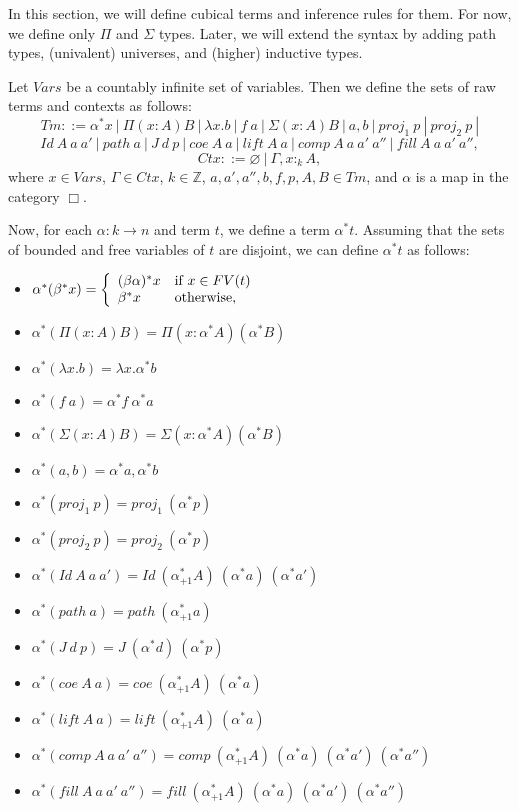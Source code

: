 \documentclass{amsart}
\theoremstyle{definition}
\theoremstyle{remark}
\newcommand{\Z}{\mathbb{Z}}
\numberwithin{table}{section}
\begin{document}
In this section, we will define cubical terms and inference rules for them.
For now, we define only $\Pi$ and $\Sigma$ types.
Later, we will extend the syntax by adding path types, (univalent) universes, and (higher) inductive types.

Let $Vars$ be a countably infinite set of variables.
Then we define the sets of raw terms and contexts as follows:
\[ Tm ::= \alpha^* x\ |\ \Pi (x : A) B\ |\ \lambda x. b\ |\ f\ a\ |\ \Sigma (x : A) B\ |\ a , b\ |\ proj_1\ p\ |\ proj_2\ p\ | \]
\[ Id\ A\ a\ a'\ |\ path\ a\ |\ J\ d\ p\ |\ coe\ A\ a\ |\ lift\ A\ a\ |\ comp\ A\ a\ a'\ a''\ |\ fill\ A\ a\ a'\ a'', \]
\[ Ctx ::= \varnothing\ |\ \Gamma, x :_k A, \]
where $x \in Vars$, $\Gamma \in Ctx$, $k \in \Z$, $a, a', a'', b, f, p, A, B \in Tm$, and $\alpha$ is a map in the category $\Box$.

Now, for each $\alpha : k \to n$ and term $t$, we define a term $\alpha^* t$.
Assuming that the sets of bounded and free variables of $t$ are disjoint, we can define $\alpha^* t$ as follows:
\begin{itemize}
\item[] $\alpha^* (\beta^* x) = \left\{\begin{array}{l l}
            (\beta \alpha)^* x  & \text{if $x \in FV(t)$} \\
            \beta^* x           & \text{otherwise,}
        \end{array} \right.$
\item[] $\alpha^* (\Pi (x : A) B) = \Pi (x : \alpha^* A) (\alpha^* B)$
\item[] $\alpha^* (\lambda x. b) = \lambda x. \alpha^* b$
\item[] $\alpha^* (f\ a) = \alpha^* f\ \alpha^* a$
\item[] $\alpha^* (\Sigma (x : A) B) = \Sigma (x : \alpha^* A) (\alpha^* B)$
\item[] $\alpha^* (a , b) = \alpha^* a , \alpha^* b$
\item[] $\alpha^* (proj_1\ p) = proj_1\ (\alpha^* p)$
\item[] $\alpha^* (proj_2\ p) = proj_2\ (\alpha^* p)$
\item[] $\alpha^* (Id\ A\ a\ a') = Id\ (\alpha_{+1}^* A)\ (\alpha^* a)\ (\alpha^* a')$
\item[] $\alpha^* (path\ a) = path\ (\alpha_{+1}^* a)$
\item[] $\alpha^* (J\ d\ p) = J\ (\alpha^* d)\ (\alpha^* p)$
\item[] $\alpha^* (coe\ A\ a) = coe\ (\alpha_{+1}^* A)\ (\alpha^* a)$
\item[] $\alpha^* (lift\ A\ a) = lift\ (\alpha_{+1}^* A)\ (\alpha^* a)$
\item[] $\alpha^* (comp\ A\ a\ a'\ a'') = comp\ (\alpha_{+1}^* A)\ (\alpha^* a)\ (\alpha^* a')\ (\alpha^* a'')$
\item[] $\alpha^* (fill\ A\ a\ a'\ a'') = fill\ (\alpha_{+1}^* A)\ (\alpha^* a)\ (\alpha^* a')\ (\alpha^* a'')$
\end{itemize}
\end{document}

